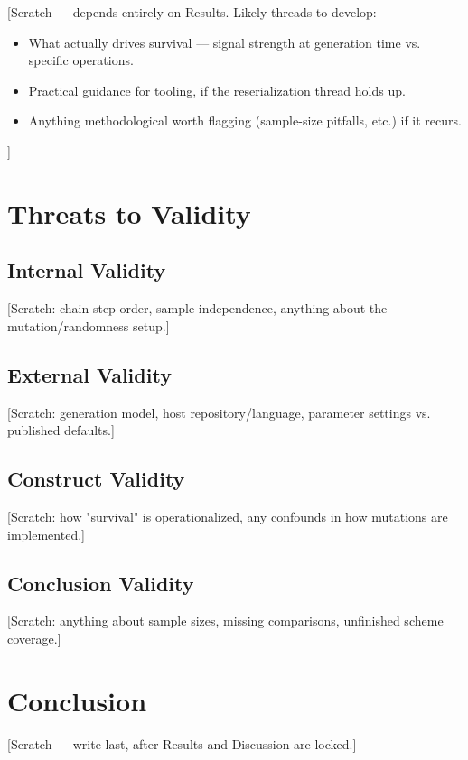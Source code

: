 \documentclass[acmsmall,screen,review,anonymous]{acmart}
\begin{document}
[Scratch --- depends entirely on Results. Likely threads to develop:
\begin{itemize}
    \item What actually drives survival --- signal strength at generation time vs. specific operations.
    \item Practical guidance for tooling, if the reserialization thread holds up.
    \item Anything methodological worth flagging (sample-size pitfalls, etc.) if it recurs.
\end{itemize}
]


\section{Threats to Validity}

\subsection{Internal Validity}
[Scratch: chain step order, sample independence, anything about the mutation/randomness setup.]

\subsection{External Validity}
[Scratch: generation model, host repository/language, parameter settings vs. published defaults.]

\subsection{Construct Validity}
[Scratch: how "survival" is operationalized, any confounds in how mutations are implemented.]

\subsection{Conclusion Validity}
[Scratch: anything about sample sizes, missing comparisons, unfinished scheme coverage.]


\section{Conclusion}

[Scratch --- write last, after Results and Discussion are locked.]




\end{document}
